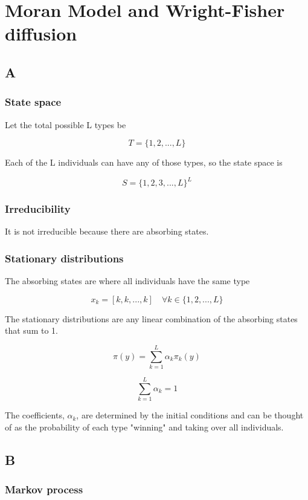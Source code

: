 \documentclass{article}
\begin{document}
\section{Moran Model and Wright-Fisher diffusion}

\subsection{A}

\subsubsection{State space}

Let the total possible L types be 

$$T = \{1,2,...,L\}$$

Each of the L individuals can have any of those types, so the state space is 

$$S = \{1,2,3,...,L\}^L$$

\subsubsection{Irreducibility}

It is not irreducible because there are absorbing states. 

\subsubsection{Stationary distributions}

The absorbing states are where all individuals have the same type

$$x_k = [k,k,...,k] \quad \forall k \in \{1,2,...,L\}  $$

The stationary distributions are any linear combination of the absorbing states that sum to 1. 

$$\pi(y) = \sum_{k=1}^L \alpha_k \pi_k(y)$$

$$\sum_{k=1}^L \alpha_k = 1$$

The coefficients, $\alpha_k$, are determined by the initial conditions and can be thought of as the probability of each type "winning" and taking over all individuals. 

\subsection{B}

\subsubsection{Markov process}
\end{document}

